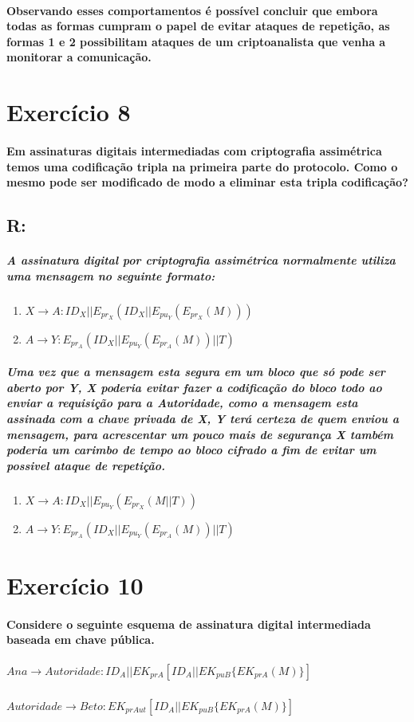 \documentclass[10pt,a4paper]{report}
\begin{document}
\paragraph{Observando esses comportamentos é possível concluir que embora todas as formas cumpram o papel de evitar ataques de repetição, as formas 1 e 2 possibilitam ataques de um criptoanalista que venha a monitorar a comunicação.}


\section*{Exercício 8}
\paragraph{ Em assinaturas digitais intermediadas com criptografia assimétrica temos uma codificação tripla na primeira parte do protocolo. Como o mesmo pode ser modificado de modo a eliminar esta tripla codificação?}
\subsection*{R:}
\subparagraph{A assinatura digital por criptografia assimétrica normalmente utiliza uma mensagem no seguinte formato:}
\begin{enumerate}
\item $X \rightarrow A: ID_X || E_{pr_X}(ID_X||E_{pu_Y}(E_{pr_X}(M))) $
\item $A \rightarrow Y: E_{pr_A}(ID_X||E_{pu_Y}(E_{pr_A}(M))||T)$
\end{enumerate}
\subparagraph{Uma vez que a mensagem esta segura em um bloco que só pode ser aberto por Y, X poderia evitar fazer a codificação do bloco todo ao enviar a requisição para a Autoridade, como a mensagem esta assinada com a chave privada de X, Y terá certeza de quem enviou a mensagem, para acrescentar um pouco mais de segurança X também poderia um carimbo de tempo ao bloco cifrado a fim de evitar um possivel ataque de repetição.}
\begin{enumerate}
\item $X \rightarrow A: ID_X||E_{pu_Y}(E_{pr_X}(M||T)) $
\item $A \rightarrow Y: E_{pr_A}(ID_X||E_{pu_Y}(E_{pr_A}(M))||T)$
\end{enumerate}

\section*{Exercício 10}
\paragraph{ Considere o seguinte esquema de assinatura digital intermediada baseada em chave pública.}
\subparagraph{$Ana \rightarrow Autoridade: ID_A || EK_{prA} [ ID_A || EK_{puB} \{ EK_{prA} ( M ) \} ]$ }
\subparagraph{$Autoridade \rightarrow Beto: EK_{prAut} [ ID_A || EK_{puB} \{ EK_{prA} ( M )\} ]$ }
\end{document}
